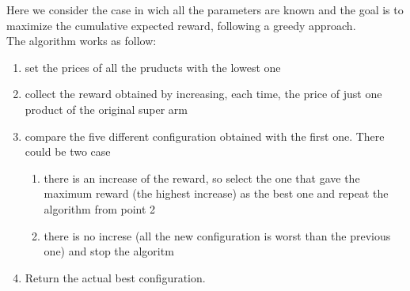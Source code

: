 Here we consider the case in wich all the parameters are known and the goal is to maximize the cumulative expected reward, following a greedy approach.\\
The algorithm works as follow:
\begin{enumerate}
    \item set the prices of all the pruducts with the lowest one
    \item collect the reward obtained by increasing, each time, the price of just one product of the original super arm
    \item compare the five different configuration obtained with the first one. There could be two case\begin{enumerate}
        \item there is an increase of the reward, so select the one that gave the maximum reward (the highest increase) as the best one and repeat the algorithm from point 2
        \item there is no increse (all the new configuration is worst than the previous one) and stop the algoritm 
    \end{enumerate}
    \item Return the actual best configuration.
\end{enumerate}



